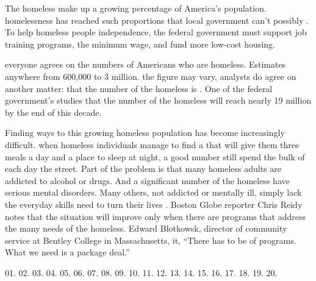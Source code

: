 \qquad The homeless make up a growing percentage of America’s population. \underline{\quad} homelessness has reached such proportions that local government can’t possibly \underline{\quad}. To help homeless people \underline{\quad} independence, the federal government must support job training programs, \underline{\quad} the minimum wage, and fund more low-cost housing.

\qquad \underline{\quad} everyone agrees on the numbers of Americans who are homeless. Estimates \underline{\quad} anywhere from 600,000 to 3 million. \underline{\quad} the figure may vary, analysts do agree on another matter: that the number of the homeless is \underline{\quad}. One of the federal government’s studies \underline{\quad} that the number of the homeless will reach nearly 19 million by the end of this decade.

\qquad Finding ways to \underline{\quad} this growing homeless population has become increasingly difficult. \underline{\quad} when homeless individuals manage to find a \underline{\quad} that will give them three meals a day and a place to sleep at night, a good number still spend the bulk of each day \underline{\quad} the street. Part of the problem is that many homeless adults are addicted to alcohol or drugs. And a significant number of the homeless have serious mental disorders. Many others, \underline{\quad} not addicted or mentally ill, simply lack the everyday \underline{\quad} skills need to turn their lives \underline{\quad}. Boston Globe reporter Chris Reidy notes that the situation will improve only when there are \underline{\quad} programs that address the many needs of the homeless. \underline{\quad} Edward Blotkowsk, director of community service at Bentley College in Massachusetts, \underline{\quad} it, “There has to be \underline{\quad} of programs. What we need is a package deal.”

01. 
02. 
03. 
04. 
05. 
06. 
07. 
08. 
09. 
10. 
11. 
12. 
13. 
14. 
15. 
16. 
17. 
18. 
19. 
20. 
